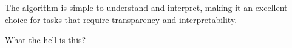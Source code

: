 \documentclass{article}
\begin{document}
The algorithm is simple to understand and interpret, making it an excellent choice for tasks that require transparency and interpretability.



What the hell is this?

\newpage


\end{document}
